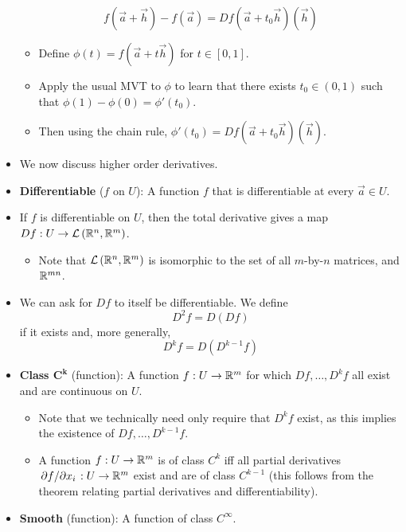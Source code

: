 \documentclass[../notes.tex]{subfiles}
\begin{document}
\begin{itemize}
    \begin{equation*}
        f(\vec{a}+\vec{h})-f(\vec{a}) = Df(\vec{a}+t_0\vec{h})(\vec{h})
    \end{equation*}
    \begin{itemize}
        \item Define $\phi(t)=f(\vec{a}+t\vec{h})$ for $t\in[0,1]$.
        \item Apply the usual MVT to $\phi$ to learn that there exists $t_0\in(0,1)$ such that $\phi(1)-\phi(0)=\phi'(t_0)$.
        \item Then using the chain rule, $\phi'(t_0)=Df(\vec{a}+t_0\vec{h})(\vec{h})$.
    \end{itemize}
    \item We now discuss higher order derivatives.
    \item \textbf{Differentiable} ($f$ on $U$): A function $f$ that is differentiable at every $\vec{a}\in U$.
    \item If $f$ is differentiable on $U$, then the total derivative gives a map $Df:U\to\mathcal{L}\left( \mathbb{R}^n,\mathbb{R}^m \right)$.
    \begin{itemize}
        \item Note that $\mathcal{L}\left( \mathbb{R}^n,\mathbb{R}^m \right)$ is isomorphic to the set of all $m$-by-$n$ matrices, and $\mathbb{R}^{mn}$.
    \end{itemize}
    \item We can ask for $Df$ to itself be differentiable. We define
    \begin{equation*}
        D^2f = D(Df)
    \end{equation*}
    if it exists and, more generally,
    \begin{equation*}
        D^kf = D(D^{k-1}f)
    \end{equation*}
    \item \textbf{Class $\bm{C^k}$} (function): A function $f:U\to\mathbb{R}^m$ for which $Df,\dots,D^kf$ all exist and are continuous on $U$.
    \begin{itemize}
        \item Note that we technically need only require that $D^kf$ exist, as this implies the existence of $Df,\dots,D^{k-1}f$.
        \item A function $f:U\to\mathbb{R}^m$ is of class $C^k$ iff all partial derivatives $\pdv*{f}{x_i}:U\to\mathbb{R}^m$ exist and are of class $C^{k-1}$ (this follows from the theorem relating partial derivatives and differentiability).
    \end{itemize}
    \item \textbf{Smooth} (function): A function of class $C^\infty$.
\end{itemize}
\end{document}
